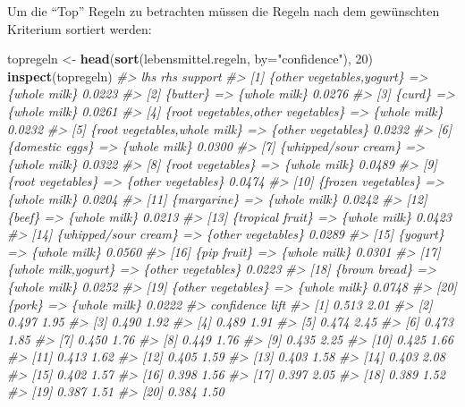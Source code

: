 \documentclass[12pt,]{book}
\makeatletter
\newenvironment{Shaded}{\begin{snugshade}}{\end{snugshade}}
\newcommand{\KeywordTok}[1]{\textcolor[rgb]{0.13,0.29,0.53}{\textbf{{#1}}}}
\newcommand{\DataTypeTok}[1]{\textcolor[rgb]{0.13,0.29,0.53}{{#1}}}
\newcommand{\DecValTok}[1]{\textcolor[rgb]{0.00,0.00,0.81}{{#1}}}
\newcommand{\StringTok}[1]{\textcolor[rgb]{0.31,0.60,0.02}{{#1}}}
\newcommand{\CommentTok}[1]{\textcolor[rgb]{0.56,0.35,0.01}{\textit{{#1}}}}
\newcommand{\NormalTok}[1]{{#1}}
\newenvironment{kframe}{%
\medskip{}
\setlength{\fboxsep}{.8em}
 \def\at@end@of@kframe{}%
 \ifinner\ifhmode%
  \def\at@end@of@kframe{\end{minipage}}%
  \begin{minipage}{\columnwidth}%
 \fi\fi%
 \def\FrameCommand##1{\hskip\@totalleftmargin \hskip-\fboxsep
 \colorbox{shadecolor}{##1}\hskip-\fboxsep
     \hskip-\linewidth \hskip-\@totalleftmargin \hskip\columnwidth}%
 \MakeFramed {\advance\hsize-\width
   \@totalleftmargin\z@ \linewidth\hsize
   \@setminipage}}%
 {\par\unskip\endMakeFramed%
 \at@end@of@kframe}
\renewenvironment{Shaded}{\begin{kframe}}{\end{kframe}}
\makeatother
\begin{document}
Um die ``Top'' Regeln zu betrachten müssen die Regeln nach dem
gewünschten Kriterium sortiert werden:

\begin{Shaded}
\begin{Highlighting}[]
\NormalTok{topregeln <-}\StringTok{ }\KeywordTok{head}\NormalTok{(}\KeywordTok{sort}\NormalTok{(lebensmittel.regeln, }\DataTypeTok{by=}\StringTok{"confidence"}\NormalTok{), }\DecValTok{20}\NormalTok{)}
\KeywordTok{inspect}\NormalTok{(topregeln)}
\CommentTok{#>      lhs                                   rhs                support}
\CommentTok{#> [1]  \{other vegetables,yogurt\}          => \{whole milk\}       0.0223 }
\CommentTok{#> [2]  \{butter\}                           => \{whole milk\}       0.0276 }
\CommentTok{#> [3]  \{curd\}                             => \{whole milk\}       0.0261 }
\CommentTok{#> [4]  \{root vegetables,other vegetables\} => \{whole milk\}       0.0232 }
\CommentTok{#> [5]  \{root vegetables,whole milk\}       => \{other vegetables\} 0.0232 }
\CommentTok{#> [6]  \{domestic eggs\}                    => \{whole milk\}       0.0300 }
\CommentTok{#> [7]  \{whipped/sour cream\}               => \{whole milk\}       0.0322 }
\CommentTok{#> [8]  \{root vegetables\}                  => \{whole milk\}       0.0489 }
\CommentTok{#> [9]  \{root vegetables\}                  => \{other vegetables\} 0.0474 }
\CommentTok{#> [10] \{frozen vegetables\}                => \{whole milk\}       0.0204 }
\CommentTok{#> [11] \{margarine\}                        => \{whole milk\}       0.0242 }
\CommentTok{#> [12] \{beef\}                             => \{whole milk\}       0.0213 }
\CommentTok{#> [13] \{tropical fruit\}                   => \{whole milk\}       0.0423 }
\CommentTok{#> [14] \{whipped/sour cream\}               => \{other vegetables\} 0.0289 }
\CommentTok{#> [15] \{yogurt\}                           => \{whole milk\}       0.0560 }
\CommentTok{#> [16] \{pip fruit\}                        => \{whole milk\}       0.0301 }
\CommentTok{#> [17] \{whole milk,yogurt\}                => \{other vegetables\} 0.0223 }
\CommentTok{#> [18] \{brown bread\}                      => \{whole milk\}       0.0252 }
\CommentTok{#> [19] \{other vegetables\}                 => \{whole milk\}       0.0748 }
\CommentTok{#> [20] \{pork\}                             => \{whole milk\}       0.0222 }
\CommentTok{#>      confidence lift}
\CommentTok{#> [1]  0.513      2.01}
\CommentTok{#> [2]  0.497      1.95}
\CommentTok{#> [3]  0.490      1.92}
\CommentTok{#> [4]  0.489      1.91}
\CommentTok{#> [5]  0.474      2.45}
\CommentTok{#> [6]  0.473      1.85}
\CommentTok{#> [7]  0.450      1.76}
\CommentTok{#> [8]  0.449      1.76}
\CommentTok{#> [9]  0.435      2.25}
\CommentTok{#> [10] 0.425      1.66}
\CommentTok{#> [11] 0.413      1.62}
\CommentTok{#> [12] 0.405      1.59}
\CommentTok{#> [13] 0.403      1.58}
\CommentTok{#> [14] 0.403      2.08}
\CommentTok{#> [15] 0.402      1.57}
\CommentTok{#> [16] 0.398      1.56}
\CommentTok{#> [17] 0.397      2.05}
\CommentTok{#> [18] 0.389      1.52}
\CommentTok{#> [19] 0.387      1.51}
\CommentTok{#> [20] 0.384      1.50}
\end{Highlighting}
\end{Shaded}
\end{document}
